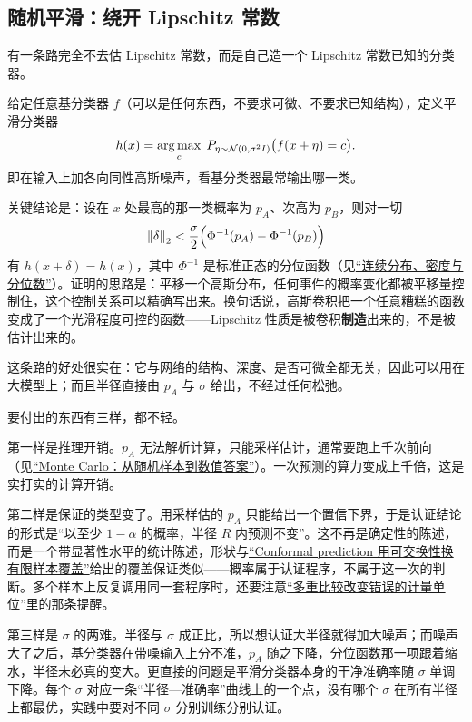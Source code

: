 \subsection{随机平滑：绕开 Lipschitz 常数}

有一条路完全不去估 Lipschitz 常数，而是自己造一个 Lipschitz 常数已知的分类器。

给定任意基分类器 \(f\)（可以是任何东西，不要求可微、不要求已知结构），定义平滑分类器
\[
h(x)=\operatorname*{arg\,max}_{c}\;P_{\eta\sim\mathcal N(0,\sigma^2 I)}\big(f(x+\eta)=c\big).
\]
即在输入上加各向同性高斯噪声，看基分类器最常输出哪一类。

关键结论是：设在 \(x\) 处最高的那一类概率为 \(p_A\)、次高为 \(p_B\)，则对一切
\[
\left\lVert\delta\right\rVert_2<\frac{\sigma}{2}\Big(\Phi^{-1}(p_A)-\Phi^{-1}(p_B)\Big)
\]
有 \(h(x+\delta)=h(x)\)，其中 \(\Phi^{-1}\) 是标准正态的分位函数（见\hyperref[sec:05-Probability/03-Random-Variables/03]{``连续分布、密度与分位数''}）。证明的思路是：平移一个高斯分布，任何事件的概率变化都被平移量控制住，这个控制关系可以精确写出来。换句话说，高斯卷积把一个任意糟糕的函数变成了一个光滑程度可控的函数——Lipschitz 性质是被卷积\textbf{制造}出来的，不是被估计出来的。

这条路的好处很实在：它与网络的结构、深度、是否可微全都无关，因此可以用在大模型上；而且半径直接由 \(p_A\) 与 \(\sigma\) 给出，不经过任何松弛。

要付出的东西有三样，都不轻。

第一样是推理开销。\(p_A\) 无法解析计算，只能采样估计，通常要跑上千次前向（见\hyperref[sec:05-Probability/08-Limit-Theorems/05]{``Monte Carlo：从随机样本到数值答案''}）。一次预测的算力变成上千倍，这是实打实的计算开销。

第二样是保证的类型变了。用采样估的 \(p_A\) 只能给出一个置信下界，于是认证结论的形式是``以至少 \(1-\alpha\) 的概率，半径 \(R\) 内预测不变''。这不再是确定性的陈述，而是一个带显著性水平的统计陈述，形状与\hyperref[sec:11-Mathematical-Statistics/07-Statistical-Decision-and-Reliable-Prediction/05]{``Conformal prediction 用可交换性换有限样本覆盖''}给出的覆盖保证类似——概率属于认证程序，不属于这一次的判断。多个样本上反复调用同一套程序时，还要注意\hyperref[sec:11-Mathematical-Statistics/05-Hypothesis-Testing/04]{``多重比较改变错误的计量单位''}里的那条提醒。

第三样是 \(\sigma\) 的两难。半径与 \(\sigma\) 成正比，所以想认证大半径就得加大噪声；而噪声大了之后，基分类器在带噪输入上分不准，\(p_A\) 随之下降，分位函数那一项跟着缩水，半径未必真的变大。更直接的问题是平滑分类器本身的干净准确率随 \(\sigma\) 单调下降。每个 \(\sigma\) 对应一条``半径—准确率''曲线上的一个点，没有哪个 \(\sigma\) 在所有半径上都最优，实践中要对不同 \(\sigma\) 分别训练分别认证。

